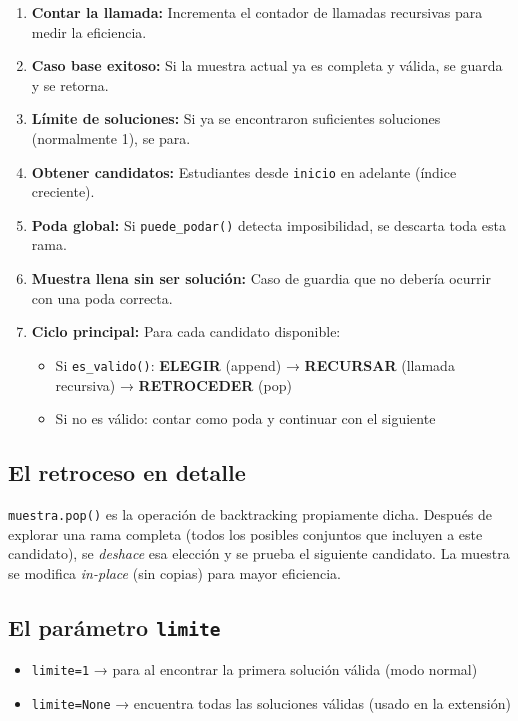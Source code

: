 \documentclass[11pt, a4paper]{article}
\begin{document}
\begin{enumerate}[noitemsep, leftmargin=*]
  \item \textbf{Contar la llamada:} Incrementa el contador de llamadas recursivas para medir la eficiencia.
  \item \textbf{Caso base exitoso:} Si la muestra actual ya es completa y válida, se guarda y se retorna.
  \item \textbf{Límite de soluciones:} Si ya se encontraron suficientes soluciones (normalmente 1), se para.
  \item \textbf{Obtener candidatos:} Estudiantes desde \texttt{inicio} en adelante (índice creciente).
  \item \textbf{Poda global:} Si \texttt{puede\_podar()} detecta imposibilidad, se descarta toda esta rama.
  \item \textbf{Muestra llena sin ser solución:} Caso de guardia que no debería ocurrir con una poda correcta.
  \item \textbf{Ciclo principal:} Para cada candidato disponible:
    \begin{itemize}[noitemsep]
      \item Si \texttt{es\_valido()}: \textbf{ELEGIR} (append) → \textbf{RECURSAR} (llamada recursiva) → \textbf{RETROCEDER} (pop)
      \item Si no es válido: contar como poda y continuar con el siguiente
    \end{itemize}
\end{enumerate}

\subsection{El retroceso en detalle}

\texttt{muestra.pop()} es la operación de backtracking propiamente dicha. Después de explorar una rama completa (todos los posibles conjuntos que incluyen a este candidato), se \emph{deshace} esa elección y se prueba el siguiente candidato. La muestra se modifica \emph{in-place} (sin copias) para mayor eficiencia.

\subsection{El parámetro \texttt{limite}}

\begin{itemize}[noitemsep]
  \item \texttt{limite=1} → para al encontrar la primera solución válida (modo normal)
  \item \texttt{limite=None} → encuentra todas las soluciones válidas (usado en la extensión)
\end{itemize}
\end{document}
